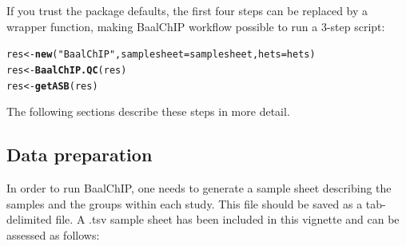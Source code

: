 \documentclass{article}\usepackage[]{graphicx}\usepackage[usenames,dvipsnames]{color}
\makeatletter
\newcommand{\hlstr}[1]{\textcolor[rgb]{0.192,0.494,0.8}{#1}}%
\newcommand{\hlstd}[1]{\textcolor[rgb]{0.345,0.345,0.345}{#1}}%
\newcommand{\hlkwb}[1]{\textcolor[rgb]{0.69,0.353,0.396}{#1}}%
\newcommand{\hlkwc}[1]{\textcolor[rgb]{0.333,0.667,0.333}{#1}}%
\newcommand{\hlkwd}[1]{\textcolor[rgb]{0.737,0.353,0.396}{\textbf{#1}}}%
\newenvironment{kframe}{%
 \def\at@end@of@kframe{}%
 \ifinner\ifhmode%
  \def\at@end@of@kframe{\end{minipage}}%
  \begin{minipage}{\columnwidth}%
 \fi\fi%
 \def\FrameCommand##1{\hskip\@totalleftmargin \hskip-\fboxsep
 \colorbox{shadecolor}{##1}\hskip-\fboxsep
     \hskip-\linewidth \hskip-\@totalleftmargin \hskip\columnwidth}%
 \MakeFramed {\advance\hsize-\width
   \@totalleftmargin\z@ \linewidth\hsize
   \@setminipage}}%
 {\par\unskip\endMakeFramed%
 \at@end@of@kframe}
\newenvironment{knitrout}{}{} %
\makeatother
\begin{document}
If you trust the package defaults, the first four steps can be replaced by a wrapper function, making BaalChIP workflow possible to run a 3-step script:
\begin{knitrout}
\color{fgcolor}\begin{kframe}
\begin{alltt}
\hlstd{res} \hlkwb{<-} \hlkwd{new}\hlstd{(}\hlstr{"BaalChIP"}\hlstd{,} \hlkwc{samplesheet}\hlstd{=samplesheet,} \hlkwc{hets}\hlstd{=hets)}
\hlstd{res} \hlkwb{<-} \hlkwd{BaalChIP.QC}\hlstd{(res)}
\hlstd{res} \hlkwb{<-} \hlkwd{getASB}\hlstd{(res)}
\end{alltt}
\end{kframe}
\end{knitrout}

The following sections describe these steps in more detail.

\subsection{Data preparation}

In order to run BaalChIP, one needs to generate a sample sheet describing the samples and the groups within each study. This file should be saved as a tab-delimited file.
A .tsv sample sheet has been included in this vignette and can be assessed as follows:
\end{document}
